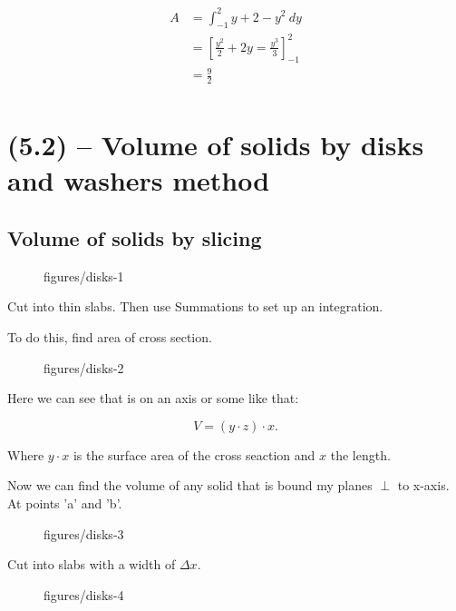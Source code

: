 \documentclass{book}
\begin{document}
\begin{align*}
    A &= \int_{-1}^{2} y+2-y^2 \ dy \\
      &= \left[ \frac{y^2}{2}+2y = \frac{y^3}{3}\right]_{-1}^2\\
      &= \frac{9}{2} \\
\end{align*}



\chapter{(5.2) -- Volume of solids by disks and washers method}

\section{Volume of solids by slicing}

\begin{figure}[ht]
    \centering
    \caption{figures/disks-1}
    \label{fig:disks}
\end{figure}

Cut into thin slabs. Then use Summations to set up an integration.

To do this, find area of cross section.


\begin{figure}[ht]
    \centering
    \caption{figures/disks-2}
    \label{fig:disks-2}
\end{figure}        

Here we can see that is on an axis or some like that:

\[ V=\left( y\cdot z \right) \cdot x .\] 

Where $y\cdot x$ is the surface area of the cross seaction and $x$ the length.

Now we can find the volume of any solid that is bound my planes $\perp$ to x-axis.
At points 'a' and 'b'.

\vspace{20pt}

\begin{figure}[htbp]
    \centering
    \caption{figures/disks-3}
    \label{fig:disks-3}
\end{figure}
Cut into slabs with a width of $\Delta x$.

\begin{figure}[ht]
    \centering
    \caption{figures/disks-4}
    \label{fig:disks-4}
\end{figure}
\end{document}
